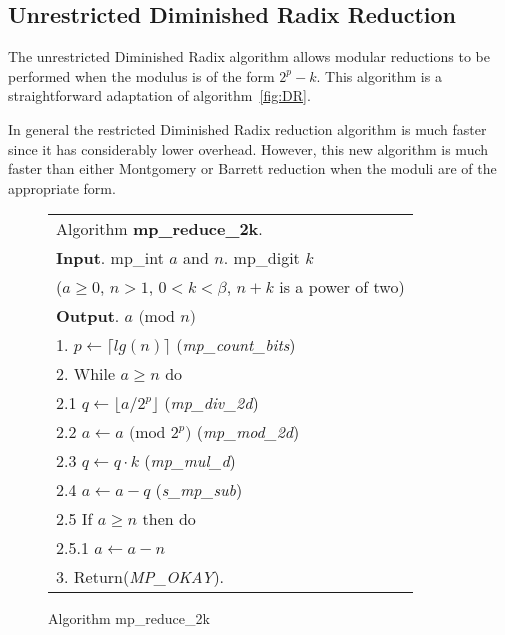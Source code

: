 \documentclass[b5paper]{book}
\begin{document}
\subsection{Unrestricted Diminished Radix Reduction}
The unrestricted Diminished Radix algorithm allows modular reductions to be performed when the modulus is of the form $2^p - k$.  This algorithm
is a straightforward adaptation of algorithm~\ref{fig:DR}.

In general the restricted Diminished Radix reduction algorithm is much faster since it has considerably lower overhead.  However, this new
algorithm is much faster than either Montgomery or Barrett reduction when the moduli are of the appropriate form.

\begin{figure}[!here]
\begin{small}
\begin{center}
\begin{tabular}{l}
\hline Algorithm \textbf{mp\_reduce\_2k}. \\
\textbf{Input}.   mp\_int $a$ and $n$.  mp\_digit $k$  \\
\hspace{11.5mm}($a \ge 0$, $n > 1$, $0 < k < \beta$, $n + k$ is a power of two) \\
\textbf{Output}.  $a \mbox{ (mod }n\mbox{)}$ \\
\hline
1.  $p \leftarrow \lceil lg(n) \rceil$  (\textit{mp\_count\_bits}) \\
2.  While $a \ge n$ do \\
\hspace{3mm}2.1  $q \leftarrow \lfloor a / 2^p \rfloor$ (\textit{mp\_div\_2d}) \\
\hspace{3mm}2.2  $a \leftarrow a \mbox{ (mod }2^p\mbox{)}$ (\textit{mp\_mod\_2d}) \\
\hspace{3mm}2.3  $q \leftarrow q \cdot k$ (\textit{mp\_mul\_d}) \\
\hspace{3mm}2.4  $a \leftarrow a - q$ (\textit{s\_mp\_sub}) \\
\hspace{3mm}2.5  If $a \ge n$ then do \\
\hspace{6mm}2.5.1  $a \leftarrow a - n$ \\
3.  Return(\textit{MP\_OKAY}). \\
\hline
\end{tabular}
\end{center}
\end{small}
\caption{Algorithm mp\_reduce\_2k}
\end{figure}
\end{document}
